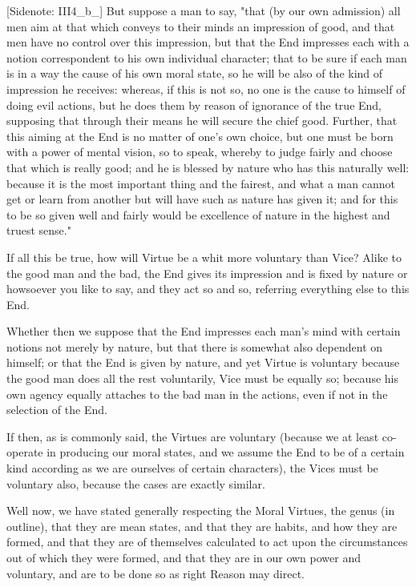 [Sidenote: III4_b_] But suppose a man to say, "that (by our own
admission) all men aim at that which conveys to their minds an
impression of good, and that men have no control over this impression,
but that the End impresses each with a notion correspondent to his own
individual character; that to be sure if each man is in a way the cause
of his own moral state, so he will be also of the kind of impression he
receives: whereas, if this is not so, no one is the cause to himself of
doing evil actions, but he does them by reason of ignorance of the true
End, supposing that through their means he will secure the chief good.
Further, that this aiming at the End is no matter of one's own choice,
but one must be born with a power of mental vision, so to speak, whereby
to judge fairly and choose that which is really good; and he is blessed
by nature who has this naturally well: because it is the most important
thing and the fairest, and what a man cannot get or learn from another
but will have such as nature has given it; and for this to be so given
well and fairly would be excellence of nature in the highest and truest
sense."

If all this be true, how will Virtue be a whit more voluntary than Vice?
Alike to the good man and the bad, the End gives its impression and is
fixed by nature or howsoever you like to say, and they act so and so,
referring everything else to this End.

Whether then we suppose that the End impresses each man's mind with
certain notions not merely by nature, but that there is somewhat also
dependent on himself; or that the End is given by nature, and yet Virtue
is voluntary because the good man does all the rest voluntarily, Vice
must be equally so; because his own agency equally attaches to the bad
man in the actions, even if not in the selection of the End.

If then, as is commonly said, the Virtues are voluntary (because we at
least co-operate in producing our moral states, and we assume the End
to be of a certain kind according as we are ourselves of certain
characters), the Vices must be voluntary also, because the cases are
exactly similar.

Well now, we have stated generally respecting the Moral Virtues, the
genus (in outline), that they are mean states, and that they are habits,
and how they are formed, and that they are of themselves calculated to
act upon the circumstances out of which they were formed, and that they
are in our own power and voluntary, and are to be done so as right
Reason may direct.

